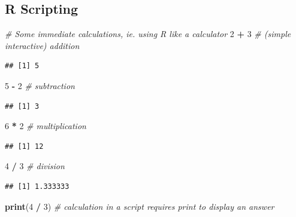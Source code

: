\documentclass[]{book}
\newenvironment{Shaded}{\begin{snugshade}}{\end{snugshade}}
\newcommand{\KeywordTok}[1]{\textcolor[rgb]{0.13,0.29,0.53}{\textbf{#1}}}
\newcommand{\DecValTok}[1]{\textcolor[rgb]{0.00,0.00,0.81}{#1}}
\newcommand{\StringTok}[1]{\textcolor[rgb]{0.31,0.60,0.02}{#1}}
\newcommand{\CommentTok}[1]{\textcolor[rgb]{0.56,0.35,0.01}{\textit{#1}}}
\newcommand{\OperatorTok}[1]{\textcolor[rgb]{0.81,0.36,0.00}{\textbf{#1}}}
\newcommand{\NormalTok}[1]{#1}
\theoremstyle{definition}
\theoremstyle{definition}
\theoremstyle{definition}
\theoremstyle{remark}
\begin{document}
\subsection{R Scripting}\label{r-scripting}

\begin{Shaded}
\begin{Highlighting}[]
\CommentTok{# Some immediate calculations, ie. using R like a calculator}
\DecValTok{2} \OperatorTok{+}\StringTok{ }\DecValTok{3}           \CommentTok{# (simple interactive) addition}
\end{Highlighting}
\end{Shaded}

\begin{verbatim}
## [1] 5
\end{verbatim}

\begin{Shaded}
\begin{Highlighting}[]
\DecValTok{5} \OperatorTok{-}\StringTok{ }\DecValTok{2}           \CommentTok{# subtraction}
\end{Highlighting}
\end{Shaded}

\begin{verbatim}
## [1] 3
\end{verbatim}

\begin{Shaded}
\begin{Highlighting}[]
\DecValTok{6} \OperatorTok{*}\StringTok{ }\DecValTok{2}           \CommentTok{# multiplication}
\end{Highlighting}
\end{Shaded}

\begin{verbatim}
## [1] 12
\end{verbatim}

\begin{Shaded}
\begin{Highlighting}[]
\DecValTok{4} \OperatorTok{/}\StringTok{ }\DecValTok{3}           \CommentTok{# division}
\end{Highlighting}
\end{Shaded}

\begin{verbatim}
## [1] 1.333333
\end{verbatim}

\begin{Shaded}
\begin{Highlighting}[]
\KeywordTok{print}\NormalTok{(}\DecValTok{4} \OperatorTok{/}\StringTok{ }\DecValTok{3}\NormalTok{)    }\CommentTok{# calculation in a script requires print to display an answer}
\end{Highlighting}
\end{Shaded}
\end{document}
